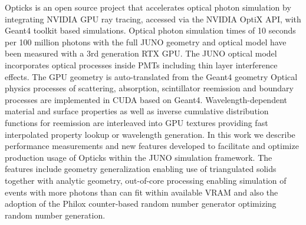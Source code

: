 Opticks is an open source project that accelerates optical photon simulation 
by integrating NVIDIA GPU ray tracing, accessed via the NVIDIA OptiX API, with
Geant4 toolkit based simulations.
Optical photon simulation times of 10 seconds per 100 million photons
with the full JUNO geometry and optical model have been measured 
with a 3rd generation RTX GPU. The JUNO optical model incorporates 
optical processes inside PMTs including thin layer interference effects. 
The GPU geometry is auto-translated from the Geant4 geometry 
Optical physics processes of scattering, absorption, scintillator reemission 
and boundary processes are implemented in CUDA based on Geant4.  
Wavelength-dependent material and surface
properties as well as inverse cumulative distribution functions for reemission
are interleaved into GPU textures providing fast interpolated property lookup
or wavelength generation. 
In this work we describe performance measurements and new features developed 
to facilitate and optimize production usage of Opticks within the JUNO simulation framework. 
The features include geometry generalization enabling use of triangulated solids 
together with analytic geometry, out-of-core processing enabling simulation of 
events with more photons than can fit within available VRAM and also the adoption
of the Philox counter-based random number generator optimizing random number generation.   

